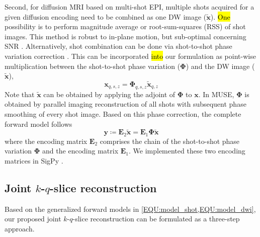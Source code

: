 \documentclass[preprint,12pt,authoryear,review]{elsarticle}
\begin{document}

    Second, for diffusion MRI based on multi-shot EPI,
    multiple shots acquired for a given diffusion encoding
    need to be combined as one DW image ($\mathbf{\tilde{x}}$).
    \hl{One} possibility is to perform magnitude average
    \citep{chen_2013_muse}
    or root-sum-squares (RSS) \citep{mani_2017_mussels}
    of shot images.
    This method is robust to in-plane motion,
    but sub-optimal concerning SNR
    \citep{guhaniyogi_2016_amuse}.
    Alternatively, shot combination can be done
    via shot-to-shot phase variation correction
    \citep{liu_2005_moco_diff,chen_2013_muse}.
    This can be incorporated \hl{into} our formulation
    as point-wise multiplication
    between the shot-to-shot phase variation ($\mathbf{\Phi}$) and
    the DW image ($\mathbf{\tilde{x}}$),
    \begin{equation}
         \mathbf{x}_{q,s,z} = \mathbf{\Phi}_{q,s,z} \mathbf{\tilde{x}}_{q,z}
    \end{equation}
    Note that $\mathbf{\tilde{x}}$ can be obtained
    by applying the adjoint of $\mathbf{\Phi}$ to $\mathbf{x}$.
    In MUSE, $\mathbf{\Phi}$ is obtained by parallel imaging reconstruction of all shots
    with subsequent phase smoothing of every shot image.
    Based on this phase correction, the complete forward model follows
    \begin{equation}
        \mathbf{y} \coloneqq \mathbf{E}_2 \mathbf{\tilde{x}} = \mathbf{E}_1 \mathbf{\Phi} \mathbf{\tilde{x}}
        \label{EQU:model_dwi}
    \end{equation}
    where the encoding matrix $\mathbf{E}_2$ comprises the chain of
    the shot-to-shot phase variation $\mathbf{\Phi}$ and
    the encoding matrix $\mathbf{E}_1$.
    We implemented these two encoding matrices in SigPy \citep{ong_2019_sigpy}.


    \subsection{Joint $k$-$q$-slice reconstruction}
    \label{SUBSEC:JETS}

    Based on the generalized forward models in \cref{EQU:model_shot,EQU:model_dwi},
    our proposed joint $k$-$q$-slice reconstruction can be formulated as a three-step approach.
\end{document}
